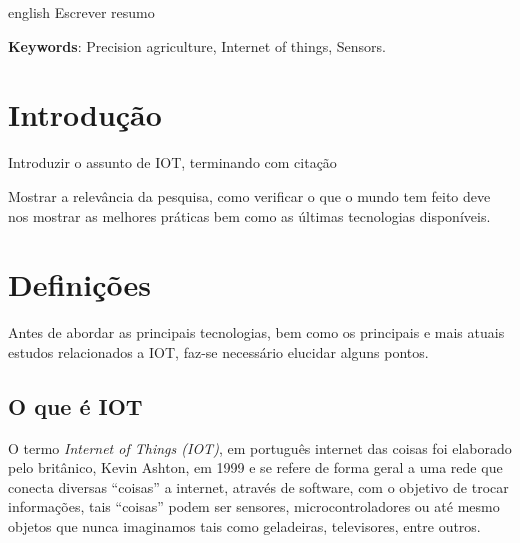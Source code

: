 \documentclass[
article,			%
12pt,				%
oneside,			%
a4paper,			%
english,			%
brazil,				%
sumario=tradicional
]{abntex2}
\begin{document}
\renewcommand{\resumoname}{Abstract}
\begin{resumoumacoluna}
  \begin{otherlanguage*}{english}
    Escrever resumo
    \vspace{\onelineskip}
    \noindent

    \textbf{Keywords}: Precision agriculture, Internet of things, Sensors.
  \end{otherlanguage*}  
\end{resumoumacoluna}



\textual
\section{Introdução}

Introduzir o assunto de IOT, terminando com citação

Mostrar a relevância da pesquisa, como verificar o que o mundo tem feito deve nos mostrar as melhores práticas bem como as últimas tecnologias disponíveis.

\section{Definições}\label{Definições}
Antes de abordar as principais tecnologias, bem como os principais e mais atuais estudos relacionados a IOT, faz-se necessário elucidar alguns pontos.
\subsection{O que é IOT}\label{O que é IOT}

O termo \textit{Internet of Things (IOT)}, em português internet das coisas foi elaborado pelo britânico, Kevin Ashton, em 1999\cite{5} e se refere de forma geral a uma rede que conecta diversas ``coisas'' a internet, através de software, com o objetivo de trocar informações\cite{defIot}, tais ``coisas'' podem ser sensores, microcontroladores ou até mesmo objetos que nunca imaginamos tais como geladeiras, televisores, entre outros.
\end{document}
